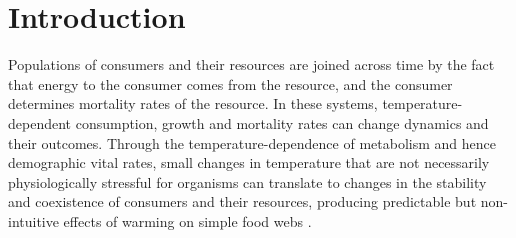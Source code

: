 \documentclass[11pt]{article}
\begin{document}
\newpage{}

\section*{Introduction}




%
%


Populations of consumers and their resources are joined across time by the fact that energy to the consumer comes from the resource, and the consumer determines mortality rates of the resource. 
In these systems, temperature-dependent consumption, growth and mortality rates can change dynamics and their outcomes. 
Through the temperature-dependence of metabolism \citep{West1997,Gillooly2001} and hence demographic vital rates, small changes in temperature that are not necessarily physiologically stressful for organisms can translate to changes in the stability and coexistence of consumers and their resources, producing predictable but non-intuitive effects of warming on simple food webs \citep{Gilbert2014,Vasseur2005,OConnor2011,Rall2010}. 
\end{document}
